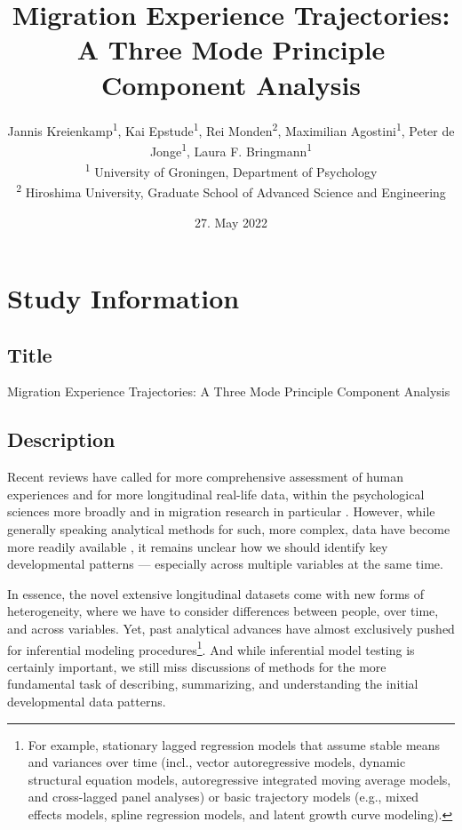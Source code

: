 \documentclass[]{article}
\title{Migration Experience Trajectories: A Three Mode Principle
Component Analysis}
\author{
          Jannis Kreienkamp\textsuperscript{1},
          Kai Epstude\textsuperscript{1},
          Rei Monden\textsuperscript{2},
          Maximilian Agostini\textsuperscript{1},
          Peter de Jonge\textsuperscript{1},
          Laura F.
Bringmann\textsuperscript{1}          \\ \vspace{0.5cm}
              \textsuperscript{1} University of Groningen, Department of
Psychology\\
              \textsuperscript{2} Hiroshima University, Graduate School
of Advanced Science and Engineering      }
\date{27. May 2022}
\newcounter{question}
\let\rmarkdownfootnote\footnote%
\def\footnote{\protect\rmarkdownfootnote}
\begin{document}
\maketitle
\vspace{2pc}


\newcommand\Question[2]{%
   \leavevmode\par
   \stepcounter{question}
   \noindent
   \textbf{\thequestion. #1}. #2\par}

\newcommand\Answer[1]{%
    \noindent
    \textit{Registered response}: #1\par}

\newlength{\mylength}
\setlength{\fboxsep}{15pt}
\setlength{\mylength}{\linewidth}
\addtolength{\mylength}{-2\fboxsep}
\addtolength{\mylength}{-2\fboxrule}

\hypertarget{study-information}{%
\section{Study Information}\label{study-information}}

\hypertarget{title}{%
\subsection{Title}\label{title}}

Migration Experience Trajectories: A Three Mode Principle Component
Analysis

\hypertarget{description}{%
\subsection{Description}\label{description}}

Recent reviews have called for more comprehensive assessment of human
experiences and for more longitudinal real-life data, within the
psychological sciences more broadly and in migration research in
particular
\citep[e.g.,][]{Kreienkamp2022d, MacInnis2015, McKeown2017, Pettigrew2011, Ward2019}.
However, while generally speaking analytical methods for such, more
complex, data have become more readily available
\citep[e.g.,][]{ODonnell2021}, it remains unclear how we should identify
key developmental patterns --- especially across multiple variables at
the same time.

In essence, the novel extensive longitudinal datasets come with new
forms of heterogeneity, where we have to consider differences between
people, over time, and across variables. Yet, past analytical advances
have almost exclusively pushed for inferential modeling
procedures\footnote{For example, stationary lagged regression models
  that assume stable means and variances over time (incl., vector
  autoregressive models, dynamic structural equation models,
  autoregressive integrated moving average models, and cross-lagged
  panel analyses) or basic trajectory models (e.g., mixed effects
  models, spline regression models, and latent growth curve modeling).}.
And while inferential model testing is certainly important, we still
miss discussions of methods for the more fundamental task of describing,
summarizing, and understanding the initial developmental data patterns.
\end{document}
